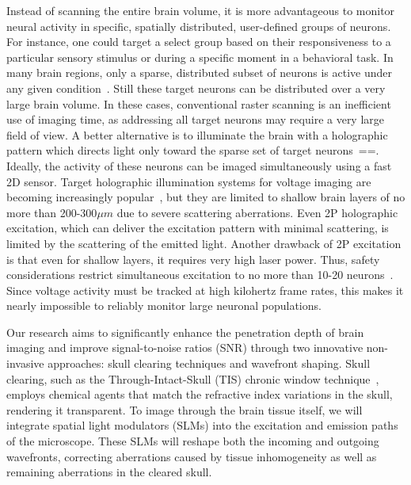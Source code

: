 Instead of scanning the entire brain volume, it is more advantageous to monitor neural activity in specific, spatially distributed, user-defined groups of neurons. For instance, one could target a select group based on their responsiveness to a particular sensory stimulus or during a specific moment in a behavioral task. In many brain regions, only a sparse, distributed subset of neurons is active under any given condition~\cite{poo2009odor,diamantaki2016sparse,hromadka2008sparse,crochet2011synaptic,peron2015cellular,tang2018large}. Still these target neurons can be distributed over a very large brain volume. In these cases, conventional raster scanning is an inefficient use of imaging time, as addressing all target neurons may require a very large field of view. A better alternative is to illuminate the brain with a holographic pattern which directs light only toward the sparse set of target neurons~\cite{Yang2018Holographic,mardinly2018precise,pegard2017three,hernandez2016three,nikolenko2008slm,dal2010simultaneous,ronzitti2017recent,vaziri2012reshaping,yang2016simultaneous,dana2014hybrid,dana2012remotely}==. Ideally, the activity of these neurons can be imaged simultaneously using a fast 2D sensor. Target holographic illumination systems for voltage imaging are becoming increasingly popular~\cite{Sims2024Scanless,Xiao2024LargeScale}, but they are limited to shallow brain layers of no more than 200-300$\mu m$  due to severe scattering aberrations. Even 2P holographic excitation, which can deliver the excitation pattern with minimal scattering, is limited by the scattering of the emitted light. Another drawback of 2P excitation is that even for shallow layers, it requires very high laser power. Thus, safety considerations restrict simultaneous excitation to no more than 10-20 neurons~\cite{Davis2024Optical}. Since voltage activity must be tracked at high kilohertz frame rates, this makes it nearly impossible to reliably monitor large neuronal populations.



Our research aims to significantly enhance the penetration depth of brain imaging and improve signal-to-noise ratios (SNR) through two innovative non-invasive approaches: skull clearing techniques and wavefront shaping. Skull clearing, such as the Through-Intact-Skull (TIS) chronic window technique~\cite{Li2022TIS}, employs chemical agents that match the refractive index variations in the skull, rendering it transparent. To image through the brain tissue itself, we will integrate spatial light modulators (SLMs) into the excitation and emission paths of the microscope. These SLMs will reshape both the incoming and outgoing wavefronts, correcting aberrations caused by tissue inhomogeneity as well as remaining aberrations in the cleared skull.

